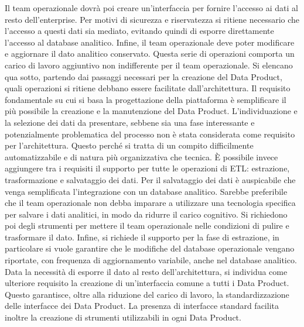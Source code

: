 \documentclass[12pt]{report}
\begin{document}
Il team operazionale dovrà poi creare un'interfaccia per fornire l'accesso ai dati al resto dell'enterprise.
Per motivi di sicurezza e riservatezza si ritiene necessario che l'accesso a questi dati sia mediato, evitando quindi di esporre direttamente l'accesso al database analitico.
Infine, il team operazionale deve poter modificare e aggiornare il dato analitico conservato.
Questa serie di operazioni comporta un carico di lavoro aggiuntivo non indifferente per il team operazionale. 
Si elencano qua sotto, partendo dai passaggi necessari per la creazione del Data Product, quali operazioni si ritiene debbano essere facilitate dall'architettura.
Il requisito fondamentale su cui si basa la progettazione della piattaforma è semplificare il più possibile la creazione e la manutenzione del Data Product.
L'individuazione e la selezione dei dati da presentare, sebbene sia una fase interessante e potenzialmente problematica del processo non è stata considerata come requisito per l'architettura. 
Questo perché si tratta di un compito difficilmente automatizzabile e di natura più organizzativa che tecnica.
È possibile invece aggiungere tra i requisiti il supporto per tutte le operazioni di ETL: estrazione, trasformazione e salvataggio dei dati.
Per il salvataggio dei dati è auspicabile che venga semplificata l'integrazione con un database analitico. 
Sarebbe preferibile che il team operazionale non debba imparare a utilizzare una tecnologia specifica per salvare i dati analitici, in modo da ridurre il carico cognitivo.
Si richiedono poi degli strumenti per mettere il team operazionale nelle condizioni di pulire e trasformare il dato.
Infine, si richiede il supporto per la fase di estrazione, in particolare si vuole garantire che le modifiche del database operazionale vengano riportate, con frequenza di aggiornamento variabile, anche nel database analitico.
Data la necessità di esporre il dato al resto dell'architettura, si individua come ulteriore requisito la creazione di un'interfaccia comune a tutti i Data Product.
Questo garantisce, oltre alla riduzione del carico di lavoro, la standardizzazione delle interfacce dei Data Product.
La presenza di interfacce standard facilita inoltre la creazione di strumenti utilizzabili in ogni Data Product.
\end{document}
